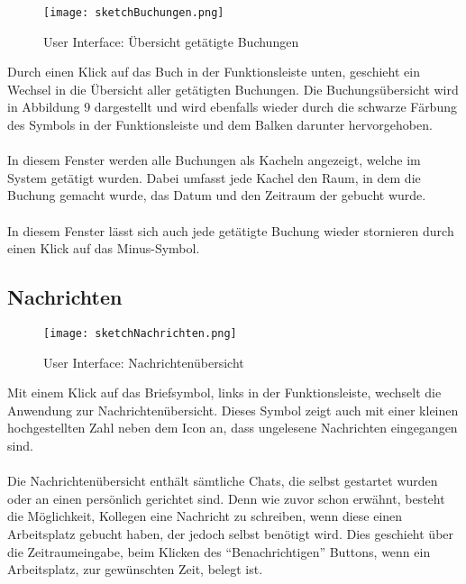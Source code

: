 \begin{wrapfigure}[20]{r}{5.5cm}
  \texttt{[image: sketchBuchungen.png]}
  \caption{User Interface: Übersicht getätigte Buchungen}
\end{wrapfigure}

Durch einen Klick auf das Buch in der Funktionsleiste unten, geschieht ein Wechsel in die Übersicht aller getätigten Buchungen.
Die Buchungsübersicht wird in Abbildung 9 dargestellt und wird ebenfalls wieder durch die schwarze Färbung des Symbols in der Funktionsleiste und dem Balken darunter hervorgehoben. \\
\paragraph{}In diesem Fenster werden alle Buchungen als Kacheln angezeigt, welche im System getätigt wurden.
Dabei umfasst jede Kachel den Raum, in dem die Buchung gemacht wurde, das Datum und den Zeitraum der gebucht wurde. \\
\paragraph{}In diesem Fenster lässt sich auch jede getätigte Buchung wieder stornieren durch einen Klick auf das Minus-Symbol.

\newpage
\subsection{Nachrichten}

\begin{wrapfigure}[23]{l}{5.5cm}
  \texttt{[image: sketchNachrichten.png]}
  \caption{User Interface: Nachrichtenübersicht}
\end{wrapfigure}

Mit einem Klick auf das Briefsymbol, links in der Funktionsleiste, wechselt die Anwendung zur Nachrichtenübersicht.
Dieses Symbol zeigt auch mit einer kleinen hochgestellten Zahl neben dem Icon an, dass ungelesene Nachrichten eingegangen sind.
\paragraph{}Die Nachrichtenübersicht enthält sämtliche Chats, die selbst gestartet wurden oder an einen persönlich gerichtet sind. 
Denn wie zuvor schon erwähnt, besteht die Möglichkeit, Kollegen eine Nachricht zu schreiben, wenn diese einen Arbeitsplatz gebucht haben, der jedoch selbst benötigt wird. 
Dies geschieht über die Zeitraumeingabe, beim Klicken des "`Benachrichtigen"' Buttons, wenn ein Arbeitsplatz, zur gewünschten Zeit, belegt ist.
